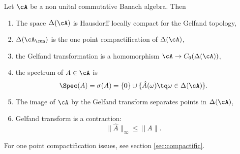 \begin{theorem}
Let $\cA$ be a non unital commutative  Banach algebra. Then

\begin{enumerate}
\item \label{enuhi} The space $\Delta(\cA)$ is Hausdorff locally compact for the Gelfand topology,
\item \label{enuhii} $\Delta(\cA_{\cun})$ is the one point compactification of $\Delta(\cA)$,
\item \label{enuhiii} the Gelfand transformation is a homomorphism $\cA\to C_0(\Delta(\cA))$,
\item \label{enuhiv} the spectrum of $A\in\cA$ is 
\[ 
  \Spec(A)=\sigma(A)=\{0\}\cup\{\hat A(\omega)\tq\omega\in\Delta(\cA)\}.
\]
\item \label{enuhv} The image of $\cA$ by the Gelfand transform separates points in $\Delta(\cA)$,
\item \label{enuhvi} Gelfand transform is a contraction:
\[ 
\|\hat A\|_{\infty}\leq\|A\|.
\]

\end{enumerate}

\end{theorem}

For one point compactification issues, see section \ref{sec:compactific}.

